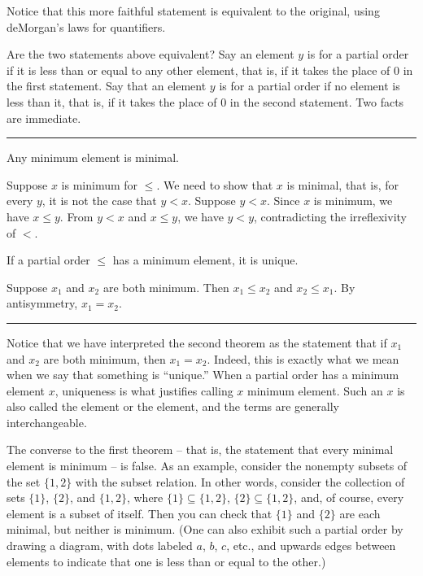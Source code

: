 \documentclass[letterpaper,10pt,english]{sphinxmanual}
\begin{document}
\sphinxAtStartPar
Notice that this more faithful statement is equivalent to the original, using deMorgan’s laws for quantifiers.

\sphinxAtStartPar
Are the two statements above equivalent? Say an element \(y\) is  for a partial order if it is less than or equal to any other element, that is, if it takes the place of 0 in the first statement. Say that an element \(y\) is  for a partial order if no element is less than it, that is, if it takes the place of 0 in the second statement. Two facts are immediate.


\bigskip\hrule\bigskip


\sphinxAtStartPar
{} Any minimum element is minimal.

\sphinxAtStartPar
{} Suppose \(x\) is minimum for \(\leq\). We need to show that \(x\) is minimal, that is, for every \(y\), it is not the case that \(y < x\). Suppose \(y < x\). Since \(x\) is minimum, we have \(x \leq y\). From \(y < x\) and \(x \leq y\), we have \(y < y\), contradicting the irreflexivity of \(<\).

\sphinxAtStartPar
{} If a partial order \(\leq\) has a minimum element, it is unique.

\sphinxAtStartPar
{} Suppose \(x_1\) and \(x_2\) are both minimum. Then \(x_1 \leq x_2\) and \(x_2 \leq x_1\). By antisymmetry, \(x_1 = x_2\).


\bigskip\hrule\bigskip


\sphinxAtStartPar
Notice that we have interpreted the second theorem as the statement that if \(x_1\) and \(x_2\) are both minimum, then \(x_1 = x_2\). Indeed, this is exactly what we mean when we say that something is “unique.” When a partial order has a minimum element \(x\), uniqueness is what justifies calling \(x\)  minimum element. Such an \(x\) is also called the  element or the  element, and the terms are generally interchangeable.

\sphinxAtStartPar
The converse to the first theorem – that is, the statement that every minimal element is minimum – is false. As an example, consider the nonempty subsets of the set \(\{ 1, 2 \}\) with the subset relation. In other words, consider the collection of sets \(\{ 1 \}\), \(\{ 2 \}\), and \(\{1, 2\}\), where \(\{ 1 \} \subseteq \{1, 2\}\), \(\{ 2 \} \subseteq \{1, 2\}\), and, of course, every element is a subset of itself. Then you can check that \(\{1\}\) and \(\{2\}\) are each minimal, but neither is minimum. (One can also exhibit such a partial order by drawing a diagram, with dots labeled \(a\), \(b\), \(c\), etc., and upwards edges between elements to indicate that one is less than or equal to the other.)
\end{document}
